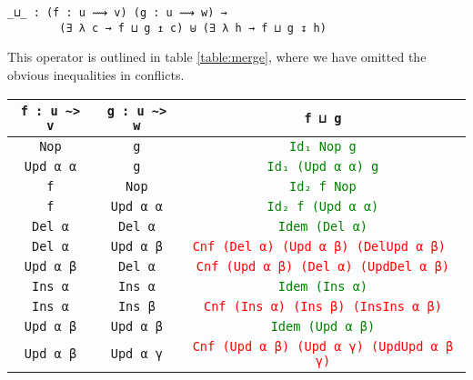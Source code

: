 \documentclass[preprint]{sigplanconf}
\theoremstyle{plain}
\begin{document}
\begin{verbatim}
_⊔_ : (f : u ⟿ v) (g : u ⟿ w) →
        (∃ λ c → f ⊔ g ↥ c) ⊎ (∃ λ h → f ⊔ g ↧ h)
\end{verbatim}
	This operator is outlined in table \ref{table:merge}, where we have
        omitted the obvious inequalities in conflicts.

	\begin{table*}[t]
	\centering
	\begin{tabular}{| c | c | c |}
	\hline
	\texttt{f : u \textasciitilde> v} & \texttt{g : u \textasciitilde> w} &  \texttt{f ⊔ g} 
	\\ \hline
	\texttt{Nop} & \texttt{g} & \textcolor{Green}{\texttt{Id₁ Nop g}} 
	\\ \hline
	\texttt{Upd α α} & \texttt{g} & \textcolor{Green}{\texttt{Id₁ (Upd α α) g}} 
	\\ \hline
	\texttt{f} & \texttt{Nop} & \textcolor{Green}{\texttt{Id₂ f Nop}} 
	\\ \hline
	\texttt{f} & \texttt{Upd α α} & \textcolor{Green}{\texttt{Id₂ f (Upd α α)}} 
	\\ \hline
	\texttt{Del α} & \texttt{Del α} & \textcolor{Green}{\texttt{Idem (Del α)}}
	\\ \hline
	\texttt{Del α} & \texttt{Upd α β} & \textcolor{Red}{\texttt{Cnf (Del α) (Upd α β) (DelUpd α β) }}
	\\ \hline
	\texttt{Upd α β} & \texttt{Del α} & \textcolor{Red}{\texttt{Cnf (Upd α β) (Del α) (UpdDel α β)}}
	\\ \hline
	\texttt{Ins α} & \texttt{Ins α} & \textcolor{Green}{\texttt{Idem (Ins α)}} 
	\\	\hline
	\texttt{Ins α} & \texttt{Ins β} & \textcolor{Red}{\texttt{Cnf (Ins α) (Ins β) (InsIns α β)}}
	\\	\hline
	\texttt{Upd α β} & \texttt{Upd α β} & \textcolor{Green}{\texttt{Idem (Upd α β)}}
	\\	\hline
	\texttt{Upd α β} & \texttt{Upd α γ} & \textcolor{Red}{\texttt{Cnf (Upd α β) (Upd α γ) (UpdUpd α β γ)}}
	\\ \hline
	\end{tabular}
	
	\captionsetup{singlelinecheck=false, justification=centering}

	\caption{Implementation of merge operator. \\
	 \texttt{f ⊔ g :} \textcolor{Red}{\texttt{f ⊔ g ↥ c}} \texttt{⊎} \textcolor{Green}{\texttt{f ⊔ g ↧ h}}}	 
	\label{table:merge}
	\end{table*}
\end{document}
